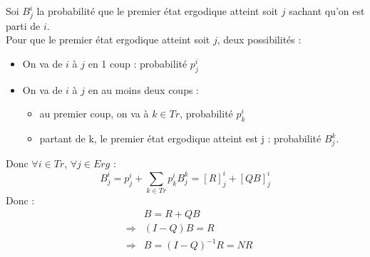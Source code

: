 \begin{dem}
Soi $B_j^i$ la probabilité que le premier état ergodique atteint soit $j$ sachant qu'on est parti de $i$.\\
Pour que le premier état ergodique atteint soit $j$, deux possibilités :
\begin{itemize}
	\item On va de $i$ à $j$ en 1 coup : probabilité $p_j^i$
	\item On va de $i$ à $j$ en au moins deux coups : \begin{itemize}
		\item au premier coup, on va à $k\in Tr$, probabilité $p_k^i$
		\item partant de k, le premier état ergodique atteint est j : probabilité $B_j^k$.
	\end{itemize}
\end{itemize}
Donc $\forall i\in Tr$, $\forall j\in Erg$ :
	\[B^i_j=p_j^i + \sum_{k\in Tr}p_k^iB_j^k=[R]^i_j + [QB]_j^i\]
Donc :
\begin{eqnarray*}
& & B=R+QB \\
&\Rightarrow& (I-Q)B=R\\
&\Rightarrow& B=(I-Q)^{-1}R=NR
\end{eqnarray*}
\end{dem}


